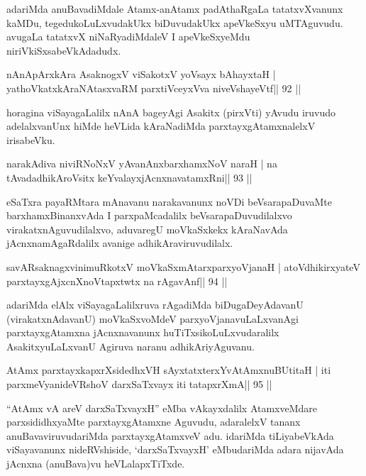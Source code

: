 \begin{artha}
adariMda anuBavadiMdale Atamx-anAtamx padAthaRgaLa tatatxvXvanunx kaMDu, tegedukoLuLxvudakUkx biDuvudakUkx apeVkeSxyu uMTAguvudu. avugaLa tatatxvX niNaRyadiMdaleV I apeVkeSxyeMdu niriVkiSxsabeVkAdadudx.
\end{artha}

\begin{shl}
nAnApArxkAra AsaknogxV viSakotxV yoV\s sayx bAhayxtaH |
yathoVkatxkAraNAtasxvaRM parxtiVceyxVva niveVshayeVtf\hfill || 92 ||
\end{shl}

\begin{artha}
horagina viSayagaLalilx nAnA bageyAgi Asakitx (pirxVti) yAvudu iruvudo adelalxvanUnx hiMde heVLida kAraNadiMda parxtayxgAtamxnalelxV irisabeVku.
\end{artha}

\begin{shl}
narakAdiva niviRNoNxV yAvanAnx\s\s  barxhamxNoV naraH |
na tAvadadhikAroV\s sitx keYvalayxjAcnxnavatamxRni\hfill || 93 ||
\end{shl}

\begin{artha}
eSaTxra payaRMtara mAnavanu narakavanunx noVDi beVsarapaDuvaMte barxhamxBinanxvAda I parxpaMcadalilx beVsarapaDuvudilalxvo virakatxnAguvudilalxvo, aduvaregU moVkaSxkekx kAraNavAda jAcnxnamAgaRdalilx avanige adhikAraviruvudilalx.
\end{artha}

\begin{shl}
savARsaknagxvinimuRkotxV moVkaSxmAtarxparxyoVjanaH |
atoV\s dhikirxyateV parxtayxgAjxcnXnoVtapxtwtx na rAgavAnf\hfill || 94 ||
\end{shl}

\begin{artha}
adariMda elAlx viSayagaLalilxruva rAgadiMda biDugaDeyAdavanU (virakatxnAdavanU) moVkaSxvoMdeV parxyoVjanavuLaLxvanAgi parxtayxgAtamxna jAcnxnavanunx huTiTxsikoLuLxvudaralilx AsakitxyuLaLxvanU Agiruva naranu adhikAriyAguvanu.
\end{artha}

\begin{shl}
AtAmx parxtayxkapxrXsidedhxVH sAyxtatxterxYvA\s\s tAmxnuBUtitaH |
iti parxmeVyanideVRshoV darxSaTxvayx iti tatapxrXmA\hfill || 95 ||
\end{shl}

\begin{artha}
``AtAmx vA areV darxSaTxvayxH'' eMba vAkayxdalilx AtamxveMdare   parxsididhxyaMte parxtayxgAtamxne Aguvudu, adaralelxV tananx   anuBavaviruvudariMda parxtayxgAtamxveV adu. idariMda tiLiyabeVkAda   viSayavanunx nideRVshiside, `darxSaTxvayxH' eMbudariMda adara   nijavAda jAcnxna (anuBava)vu heVLalapxTiTxde.
\end{artha}

